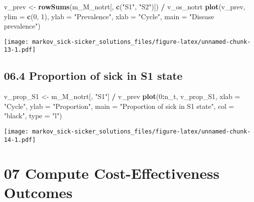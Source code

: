\documentclass[
]{article}
\newenvironment{Shaded}{\begin{snugshade}}{\end{snugshade}}
\newcommand{\DataTypeTok}[1]{\textcolor[rgb]{0.13,0.29,0.53}{#1}}
\newcommand{\DecValTok}[1]{\textcolor[rgb]{0.00,0.00,0.81}{#1}}
\newcommand{\KeywordTok}[1]{\textcolor[rgb]{0.13,0.29,0.53}{\textbf{#1}}}
\newcommand{\NormalTok}[1]{#1}
\newcommand{\OperatorTok}[1]{\textcolor[rgb]{0.81,0.36,0.00}{\textbf{#1}}}
\newcommand{\StringTok}[1]{\textcolor[rgb]{0.31,0.60,0.02}{#1}}
\begin{document}
\begin{Shaded}
\begin{Highlighting}[]
\NormalTok{v_prev <-}\StringTok{ }\KeywordTok{rowSums}\NormalTok{(m_M_notrt[, }\KeywordTok{c}\NormalTok{(}\StringTok{"S1"}\NormalTok{, }\StringTok{"S2"}\NormalTok{)]) }\OperatorTok{/}\StringTok{ }\NormalTok{v_os_notrt}
\KeywordTok{plot}\NormalTok{(v_prev,}
     \DataTypeTok{ylim =} \KeywordTok{c}\NormalTok{(}\DecValTok{0}\NormalTok{, }\DecValTok{1}\NormalTok{),}
     \DataTypeTok{ylab =} \StringTok{"Prevalence"}\NormalTok{,}
     \DataTypeTok{xlab =} \StringTok{"Cycle"}\NormalTok{,}
     \DataTypeTok{main =} \StringTok{"Disease prevalence"}\NormalTok{)}
\end{Highlighting}
\end{Shaded}

\texttt{[image: markov\_sick-sicker\_solutions\_files/figure-latex/unnamed-chunk-13-1.pdf]}

\hypertarget{proportion-of-sick-in-s1-state}{%
\subsection{06.4 Proportion of sick in S1
state}\label{proportion-of-sick-in-s1-state}}

\begin{Shaded}
\begin{Highlighting}[]
\NormalTok{v_prop_S1 <-}\StringTok{ }\NormalTok{m_M_notrt[, }\StringTok{"S1"}\NormalTok{] }\OperatorTok{/}\StringTok{ }\NormalTok{v_prev}
\KeywordTok{plot}\NormalTok{(}\DecValTok{0}\OperatorTok{:}\NormalTok{n_t, v_prop_S1,}
     \DataTypeTok{xlab =} \StringTok{"Cycle"}\NormalTok{, }
     \DataTypeTok{ylab =} \StringTok{"Proportion"}\NormalTok{, }
     \DataTypeTok{main =} \StringTok{"Proportion of sick in S1 state"}\NormalTok{, }
     \DataTypeTok{col  =} \StringTok{"black"}\NormalTok{, }\DataTypeTok{type =} \StringTok{"l"}\NormalTok{)}
\end{Highlighting}
\end{Shaded}

\texttt{[image: markov\_sick-sicker\_solutions\_files/figure-latex/unnamed-chunk-14-1.pdf]}

\hypertarget{compute-cost-effectiveness-outcomes}{%
\section{07 Compute Cost-Effectiveness
Outcomes}\label{compute-cost-effectiveness-outcomes}}
\end{document}
